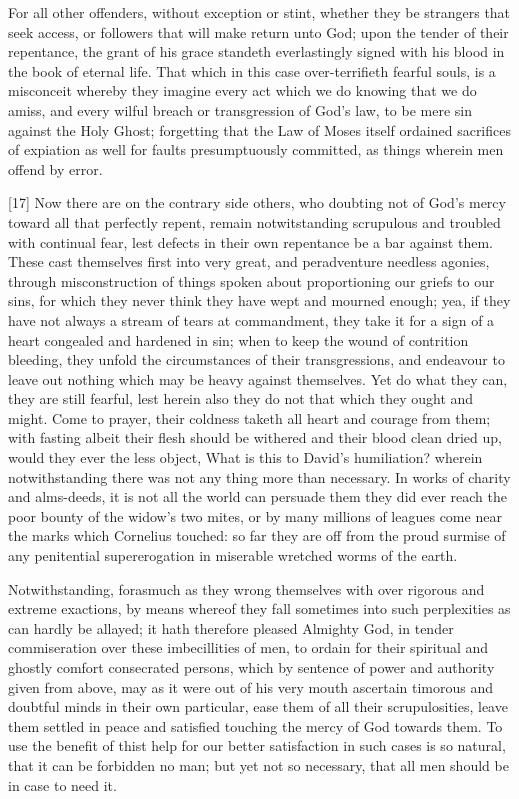 For all other offenders, without exception or stint, whether they be strangers that seek access, or followers that will make return unto God; upon the tender of their repentance, the grant of his grace standeth everlastingly signed with his blood in the book of eternal life. That which in this case over-terrifieth fearful souls, is a misconceit whereby they imagine every act which we do knowing that we do amiss, and every wilful breach or transgression of God’s law, to be mere sin against the Holy Ghost; forgetting that the Law of Moses itself ordained sacrifices of expiation as well for faults presumptuously committed, as things wherein men offend by error.

[17] Now there are on the contrary side others, who doubting not of God’s mercy toward all that perfectly repent, remain notwitstanding scrupulous and troubled with continual fear, lest defects in their own repentance be a bar  against them. These cast themselves first into very great, and peradventure needless agonies, through misconstruction of things spoken about proportioning our griefs to our sins, for which they never think they have wept and mourned enough; yea, if they have not always a stream of tears at commandment, they take it for a sign of a heart congealed and hardened in sin; when to keep the wound of contrition bleeding, they unfold the circumstances of their transgressions, and endeavour to leave out nothing which may be heavy against themselves. Yet do what they can, they are still fearful, lest herein also they do not that which they ought and might. Come to prayer, their coldness taketh all heart and courage from them; with fasting albeit their flesh should be withered and their blood clean dried up, would they ever the less object, What is this to David’s humiliation? wherein notwithstanding there was not any thing more than necessary. In works of charity and alms-deeds, it is not all the world can persuade them they did ever reach the poor bounty of the widow’s two mites, or by many millions of leagues come near the marks which Cornelius touched: so far they are off from the proud surmise of any penitential supererogation in miserable wretched worms of the earth.

Notwithstanding, forasmuch as they wrong themselves with over rigorous and extreme exactions, by means whereof they fall sometimes into such perplexities as can hardly be allayed; it hath therefore pleased Almighty God, in tender commiseration over these imbecillities of men, to ordain for their spiritual and ghostly comfort consecrated persons, which by sentence of power and authority given from above, may as it were out of his very mouth ascertain timorous and doubtful  minds in their own particular, ease them of all their scrupulosities, leave them settled in peace and satisfied touching the mercy of God towards them. To use the benefit of thist help for our better satisfaction in such cases is so natural, that it can be forbidden no man; but yet not so necessary, that all men should be in case to need it.

